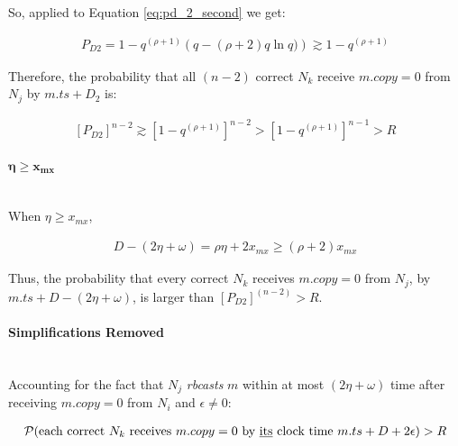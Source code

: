     So, applied to Equation \ref{eq:pd_2_second} we get:
    
    \begin{equation}
        \begin{aligned}
                P_{D2} = 1 - q^{(\rho+1)} \left( q - (\rho + 2) q \ln q)    \right) \gtrsim 1 - q^{(\rho + 1)}
            \end{aligned}
        \end{equation}
        
        Therefore, the probability that all $(n-2)$ correct $N_k$ receive $m.copy = 0$ from $N_j$ by $m.ts + D_2$ is:
        
    \begin{equation}
        \begin{aligned}
                \left[P_{D2} \right]^{n-2} \gtrsim \left[ 1 - q^{(\rho+1)} \right] ^{n-2} > \left[ 1 - q ^{(\rho + 1)}\right]^{n-1} > R
        \end{aligned}
    \end{equation}
    
    
    \paragraph{$\bm{\eta \geq x_{mx}}$} \hfill \\
    When $\eta \geq x_{mx}$,
    
    \begin{equation}
        \begin{aligned}
                D - \left( 2 \eta + \omega \right) = \rho \eta + 2 x_{mx} \geq (\rho + 2) x_{mx}
            \end{aligned}
        \end{equation}
        
    Thus, the probability that every correct $N_k$ receives $m.copy = 0$ from $N_j$, by ${m.ts + D - (2\eta + \omega)}$, is larger than ${\left[P_{D2}\right]^{(n - 2)} > R}$.  

    \paragraph{Simplifications Removed} \hfill \\    
    Accounting for the fact that $N_j$ \emph{rbcasts} $m$ within at most $(2 \eta + \omega)$ time after receiving $m.copy = 0$ from $N_i$ and $\epsilon \neq 0$:
    
    \begin{equation}
        \begin{aligned}
                \mathcal{P}(\text{each correct } N_k \text{ receives } m.copy = 0 \text{ by \underline{its} clock time } m.ts + D + 2\epsilon) > R
         \end{aligned}
    \end{equation}
    
